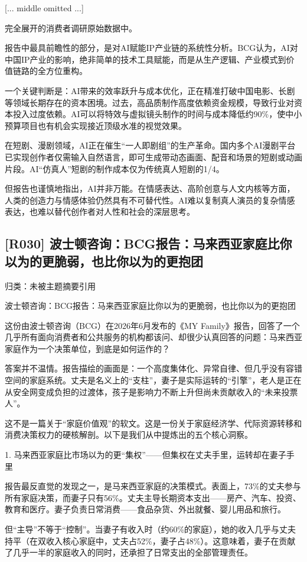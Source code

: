 \documentclass[11pt]{ctexart}
\begin{document}
[... middle omitted ...]

完全展开的消费者调研原始数据中。

报告中最具前瞻性的部分，是对AI赋能IP产业链的系统性分析。BCG认为，AI对中国IP产业的影响，绝非简单的技术工具赋能，而是从生产逻辑、产业模式到价值链路的全方位重构。

一个关键判断是：AI带来的效率跃升与成本优化，正在精准打破中国电影、长剧等领域长期存在的资本困境。过去，高品质制作高度依赖资金规模，导致行业对资本投入过度依赖。AI可以将特效与虚拟镜头制作的时间与成本降低约90\%，使中小预算项目也有机会实现接近顶级水准的视觉效果。

在短剧、漫剧领域，AI正在催生“一人即剧组”的生产革命。国内多个AI漫剧平台已实现创作者仅需输入自然语言，即可生成带动态画面、配音和场景的短剧或动画片段。AI“仿真人”短剧的制作成本仅为传统真人短剧的1/4。

但报告也谨慎地指出，AI并非万能。在情感表达、高阶创意与人文内核等方面，人类的创造力与情感体验仍然具有不可替代性。AI难以复制真人演员的复杂情感表达，也难以替代创作者对人性和社会的深层思考。

\subsection{[R030] 波士顿咨询：BCG报告：马来西亚家庭比你以为的更脆弱，也比你以为的更抱团}
{\small\color{refgray}归类：未被主题摘要引用}

波士顿咨询：BCG报告：马来西亚家庭比你以为的更脆弱，也比你以为的更抱团

这份由波士顿咨询（BCG）在2026年6月发布的《MY Family》报告，回答了一个几乎所有面向消费者和公共服务的机构都该问、却很少认真回答的问题：马来西亚家庭作为一个决策单位，到底是如何运作的？

答案并不温情。报告描绘的画面是：一个高度集体化、异常自律、但几乎没有容错空间的家庭系统。丈夫是名义上的“支柱”，妻子是实际运转的“引擎”，老人是正在从安全网变成负担的过渡体，孩子是影响力不断上升但尚未贡献收入的“未来投票人”。

这不是一篇关于“家庭价值观”的软文。这是一份关于家庭经济学、代际资源转移和消费决策权力的硬核解剖。以下是我们从中提炼出的五个核心洞察。

1. 马来西亚家庭比市场以为的更“集权”——但集权在丈夫手里，运转却在妻子手里

报告最反直觉的发现之一，是马来西亚家庭的决策模式。表面上，73\%的丈夫参与所有家庭决策，而妻子只有56\%。丈夫主导长期资本支出——房产、汽车、投资、教育和医疗。妻子负责日常消费——食品杂货、外出就餐、婴儿用品和旅行。

但“主导”不等于“控制”。当妻子有收入时（约60\%的家庭），她的收入几乎与丈夫持平（在双收入核心家庭中，丈夫占52\%，妻子占48\%）。这意味着，妻子在贡献了几乎一半的家庭收入的同时，还承担了日常支出的全部管理责任。
\end{document}
